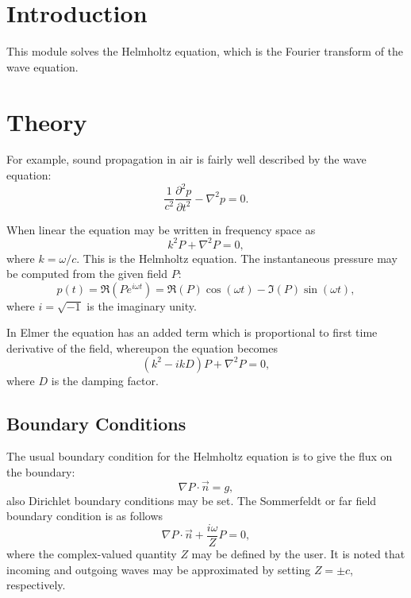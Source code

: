 
\begin{versiona}

\section{Introduction}

This module solves the Helmholtz equation, which is the Fourier transform
of the wave equation. 

\section{Theory}

For example, sound propagation in air is fairly well described by the
wave equation:
\begin{equation}
\frac{1}{c^2}\frac{\partial^2 p}{\partial t^2} - \nabla^2p  = 0.
\end{equation}

When linear the equation may be written in frequency space as
\begin{equation}
k^2 P + \nabla^2P  = 0,
\end{equation}
where $k=\omega/c$.
This is the Helmholtz equation.
The instantaneous pressure may be computed
from the given field $P$:
\begin{equation}
p(t) = \Re(P e^{i\omega t}) = \Re(P)\cos(\omega t) - \Im(P)\sin(\omega t),
\end{equation}
where $i=\sqrt{-1}$ is the imaginary unity.

In Elmer  the equation has an added term which is proportional
to first time derivative of the field, whereupon the equation becomes
\begin{equation}
(k^2 - ikD)P + \nabla^2P  = 0,
\label{eq-sdamp}
\end{equation}
where $D$ is the damping factor.


\subsection{Boundary Conditions}

The usual boundary condition for the Helmholtz equation is to
give the flux on the boundary:
\begin{equation}
\nabla P\cdot\Vec{n} = g,
\end{equation}
also Dirichlet boundary conditions may be set.
The Sommerfeldt or far field boundary condition is as follows
\begin{equation}\label{Sommerfeldt-bc}
\nabla P\cdot\Vec{n} + \frac{i\omega}{Z}P = 0,
\end{equation}
where the complex-valued quantity $Z$ may be defined by the user.
It is noted that incoming and outgoing waves may be approximated by
setting $Z=\pm c$, respectively.




\end{versiona}
